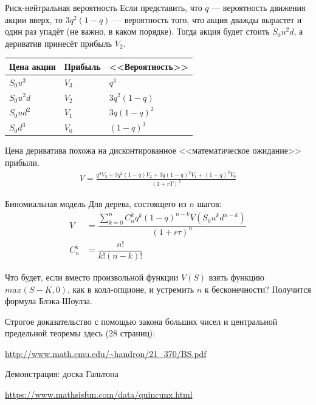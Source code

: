 \documentclass{beamer}
\begin{document}
\begin{frame}{Риск-нейтральная вероятность}
\justify
Если представить, что $q$ --- вероятность движения акции вверх, то $3q^2(1-q)$ --- вероятность того, что акция дважды вырастет и один раз упадёт (не важно, в каком порядке). Тогда акция будет стоить $S_0u^2d$, а дериватив принесёт прибыль $V_2$.

\justify
\centering
\begin{tabular}{l|l|l}
Цена акции & Прибыль & <<Вероятность>> \\ \hline
$S_0u^3$   & $V_3$   & $q^3$ \\
$S_0u^2d$  & $V_2$   & $3q^2(1-q)$ \\
$S_0ud^2$  & $V_1$   & $3q(1-q)^2$ \\ 
$S_0d^3$   & $V_0$   & $(1-q)^3$ 
\end{tabular}

\justify
Цена дериватива похожа на дисконтированное <<математическое ожидание>> прибыли.
\begin{align*}
V = \frac{q^3V_3 + 3q^2(1-q)V_2 + 3q(1-q)^2V_1 + (1-q)^3V_0}{(1+rT)^3}
\end{align*}
\end{frame}



\begin{frame}{Биномиальная модель}
Для дерева, состоящего из $n$ шагов:
\begin{align*}
V &= \dfrac{\sum\limits_{k=0}^{n} C^k_nq^k(1-q)^{n-k}V(S_0u^kd^{n-k})}{(1+r\tau)^n} \\
C^k_n &= \dfrac{n!}{k!(n-k)!}
\end{align*}

\justify
Что будет, если вместо произвольной функции $V(S)$ взять функцию $max(S-K,0)$, как в колл-опционе, и устремить $n$ к бесконечности? Получится формула Блэка-Шоулза.

\vspace{\baselineskip}
Строгое доказательство с помощью закона больших чисел и центральной
предельной теоремы здесь (28 страниц):

\url{http://www.math.cmu.edu/~handron/21_370/BS.pdf}
\end{frame}



\begin{frame}{Демонстрация: доска Гальтона}

\url{https://www.mathsisfun.com/data/quincunx.html}
\end{frame}
\end{document}
